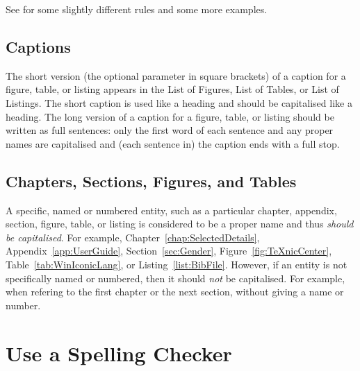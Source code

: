 See \textcite{WB-Capitalisation} for some slightly different rules and
some more examples.






\subsection{Captions}

The short version (the optional parameter in square brackets) of a
caption for a figure, table, or listing appears in the List of
Figures, List of Tables, or List of Listings. The short caption is
used like a heading and should be capitalised like a heading. The long
version of a caption for a figure, table, or listing should be written
as full sentences: only the first word of each sentence and any proper
names are capitalised and (each sentence in) the caption ends with a
full stop.



\subsection{Chapters, Sections, Figures, and Tables}

A specific, named or numbered entity, such as a particular chapter,
appendix, section, figure, table, or listing is considered to be a
proper name and thus \emph{should be capitalised}. For example,
Chapter~\ref{chap:SelectedDetails}, Appendix~\ref{app:UserGuide},
Section~\ref{sec:Gender}, Figure~\ref{fig:TeXnicCenter},
Table~\ref{tab:WinIconicLang}, or Listing~\ref{list:BibFile}. However,
if an entity is not specifically named or numbered, then it should
\emph{not} be capitalised. For example, when refering to the first
chapter or the next section, without giving a name or number.











\section{Use a Spelling Checker}

